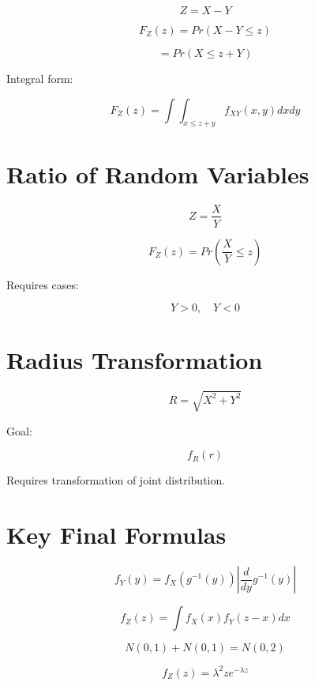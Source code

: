 \documentclass[12pt]{article}
\begin{document}
\[
Z = X - Y
\]

\[
F_Z(z)
=
Pr(X-Y \le z)
\]

\[
=
Pr(X \le z+Y)
\]

Integral form:

\[
F_Z(z)
=
\int
\int_{x \le z+y}
f_{XY}(x,y)
dx dy
\]

\section{Ratio of Random Variables}

\[
Z =
\frac{X}{Y}
\]

\[
F_Z(z)
=
Pr\left(\frac{X}{Y} \le z\right)
\]

Requires cases:

\[
Y > 0, \quad Y < 0
\]

\section{Radius Transformation}

\[
R =
\sqrt{X^2 + Y^2}
\]

Goal:

\[
f_R(r)
\]

Requires transformation of joint distribution.

\section{Key Final Formulas}

\[
\boxed{
f_Y(y)
=
f_X(g^{-1}(y))
\left|
\frac{d}{dy}g^{-1}(y)
\right|
}
\]

\[
\boxed{
f_Z(z)
=
\int f_X(x)f_Y(z-x)dx
}
\]

\[
\boxed{
N(0,1)+N(0,1)=N(0,2)
}
\]

\[
\boxed{
f_Z(z)=\lambda^2 z e^{-\lambda z}
}
\]
\end{document}
